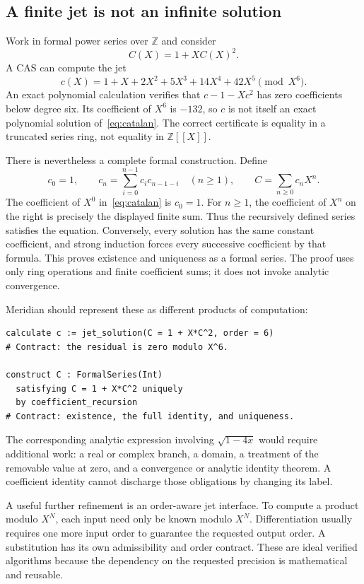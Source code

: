 \documentclass[11pt,a4paper]{article}
\newcommand{\Z}{\mathbb Z}
\theoremstyle{remark}
\begin{document}
\subsection{A finite jet is not an infinite solution}
Work in formal power series over $\Z$ and consider
\begin{equation}
 C(X)=1+XC(X)^2.\label{eq:catalan}
\end{equation}
A CAS can compute the jet
\[
 c(X)=1+X+2X^2+5X^3+14X^4+42X^5\pmod{X^6}.
\]
An exact polynomial calculation verifies that
$c-1-Xc^2$ has zero coefficients below degree six. Its coefficient of $X^6$
is $-132$, so $c$ is not itself an exact polynomial solution of~\eqref{eq:catalan}.
The correct certificate is equality in a truncated series ring, not equality in
$\Z[[X]]$.

There is nevertheless a complete formal construction. Define
\[
 c_0=1,\qquad
 c_n=\sum_{i=0}^{n-1}c_i c_{n-1-i}\quad(n\ge1),
 \qquad C=\sum_{n\ge0}c_nX^n.
\]
The coefficient of $X^0$ in~\eqref{eq:catalan} is $c_0=1$. For $n\ge1$, the
coefficient of $X^n$ on the right is precisely the displayed finite sum. Thus
the recursively defined series satisfies the equation. Conversely, every
solution has the same constant coefficient, and strong induction forces every
successive coefficient by that formula. This proves existence and uniqueness
as a formal series. The proof uses only ring operations and finite coefficient
sums; it does not invoke analytic convergence.

Meridian should represent these as different products of computation:
\par\smallskip\noindent\begin{minipage}{\linewidth}
\begin{lstlisting}
calculate c := jet_solution(C = 1 + X*C^2, order = 6)
# Contract: the residual is zero modulo X^6.

construct C : FormalSeries(Int)
  satisfying C = 1 + X*C^2 uniquely
  by coefficient_recursion
# Contract: existence, the full identity, and uniqueness.
\end{lstlisting}
\end{minipage}\par\smallskip
The corresponding analytic expression involving $\sqrt{1-4x}$ would require
additional work: a real or complex branch, a domain, a treatment of the removable
value at zero, and a convergence or analytic identity theorem. A coefficient
identity cannot discharge those obligations by changing its label.

A useful further refinement is an order-aware jet interface. To compute a product
modulo $X^N$, each input need only be known modulo $X^N$. Differentiation usually
requires one more input order to guarantee the requested output order. A
substitution has its own admissibility and order contract. These are ideal
verified algorithms because the dependency on the requested precision is
mathematical and reusable.
\end{document}
